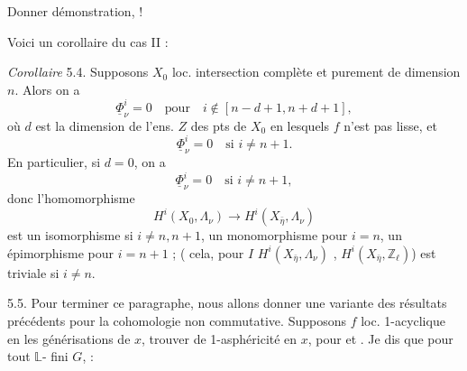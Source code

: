 \documentclass[11pt,a4paper]{article}
\begin{document}
Donner démonstration, !



Voici un corollaire du cas II :

\emph{Corollaire} 5.4. Supposons  $X_0$ loc. intersection complète
et purement de dimension $n$. Alors on a
\[
\underline{\Phi}^i_\nu = 0 \quad \text{pour}\quad
i \notin [n-d+1, n+d+1] ,
\]
où $d$ est la dimension de l'ens. $Z$ des pts de $X_0$ en lesquels $f$ n'est pas lisse,
\struck{\ill{}} et
\[
\underline{\Phi}^i_\nu = 0 \quad \text{si } i \neq n+1 .
\]
En particulier, si $d = 0$, on a
\[
\underline{\Phi}^i_\nu = 0 \quad \text{si } i \neq n+1 ,
\]
donc l'homomorphisme
\[
H^i(X_0, \Lambda_\nu) \longrightarrow H^i(X_{\bar\eta}, \Lambda_\nu)
\]
est un isomorphisme si $i \neq n, n+1$, un monomorphisme pour $i = n$, 
un épimorphisme pour $i = n+1$ ; (\uncertain{\ill{}} cela,  \ill{}
pour  $I$  $H^i(X_{\bar\eta}, \Lambda_\nu)$
, \uncertain{\ill{}} $H^i(X_{\bar\eta}, \mathbb{Z}_\ell)$)
est triviale si $i \neq n$.

5.5. Pour terminer ce paragraphe, nous allons donner une variante des résultats précédents
pour la cohomologie non commutative. Supposons \struck{\ill{}} 
$f$ loc. 1-acyclique en les générisations  de $x$, \struck{\ill{}}
\ill{} trouver \struck{\ill{}}  \struck{\ill{}} de
 1-asphéricité en $x$, pour \struck{\ill{}}  et
  \struck{\ill{}} .
\struck{\ill{}}
Je dis que pour tout $\mathbb{L}$- fini $G$, \struck{\ill{}} \ill{} :

\end{document}

